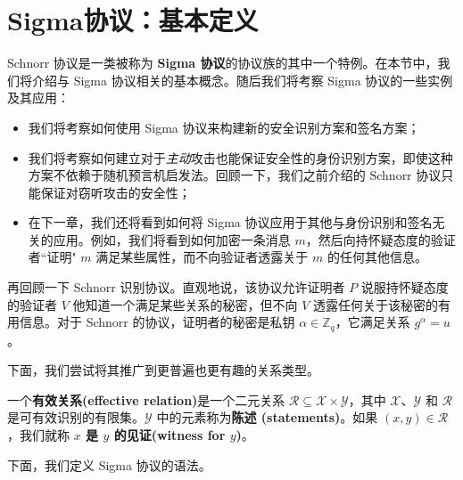 \section{Sigma协议：基本定义}

Schnorr 协议是一类被称为 \textbf{Sigma 协议}的协议族的其中一个特例。在本节中，我们将介绍与 Sigma 协议相关的基本概念。随后我们将考察 Sigma 协议的一些实例及其应用：
\begin{itemize}
	\item 我们将考察如何使用 Sigma 协议来构建新的安全识别方案和签名方案；
	\item 我们将考察如何建立对于\emph{主动}攻击也能保证安全性的身份识别方案，即使这种方案不依赖于随机预言机启发法。回顾一下，我们之前介绍的 Schnorr 协议只能保证对窃听攻击的安全性；
	\item 在下一章，我们还将看到如何将 Sigma 协议应用于其他与身份识别和签名无关的应用。例如，我们将看到如何加密一条消息 $m$，然后向持怀疑态度的验证者``证明" $m$ 满足某些属性，而不向验证者透露关于 $m$ 的任何其他信息。
\end{itemize}


再回顾一下 Schnorr 识别协议。直观地说，该协议允许证明者 $P$ 说服持怀疑态度的验证者 $V$ 他知道一个满足某些关系的秘密，但不向 $V$ 透露任何关于该秘密的有用信息。对于 Schnorr 的协议，证明者的秘密是私钥 $\alpha\in\mathbb{Z}_q$，它满足关系 $g^\alpha=u$。

下面，我们尝试将其推广到更普遍也更有趣的关系类型。

\begin{definition}[有效关系]
一个\textbf{有效关系(effective relation)}是一个二元关系 $\mathcal{R}\subseteq\mathcal{X}×\mathcal{Y}$，其中 $\mathcal{X}$、$\mathcal{Y}$ 和 $\mathcal{R}$ 是可有效识别的有限集。$\mathcal{Y}$ 中的元素称为\textbf{陈述 (statements)}。如果 $(x,y)\in\mathcal{R}$，我们就称 \textbf{$x$ 是 $y$ 的见证(witness for $y$)}。
\end{definition}

下面，我们定义 Sigma 协议的语法。

